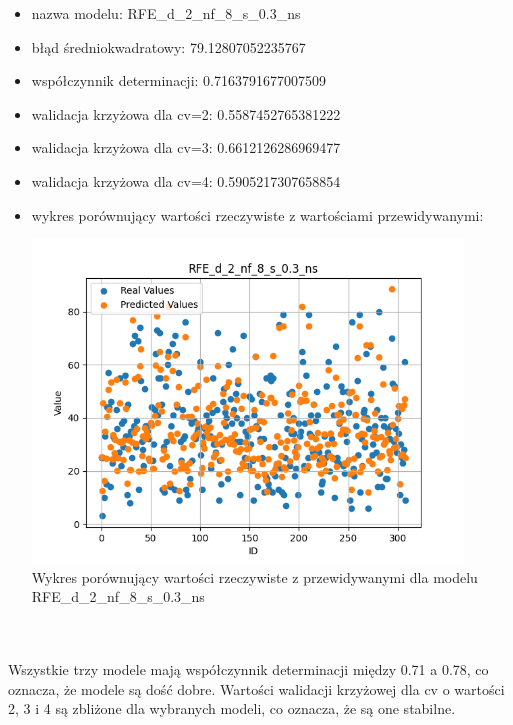 \documentclass[11pt, a4paper, notitlepage]{report}
\begin{document}
\begin{itemize}
	\item nazwa modelu: RFE\_d\_2\_nf\_8\_s\_0.3\_ns
	\item błąd średniokwadratowy: 79.12807052235767
	\item współczynnik determinacji: 0.7163791677007509
	\item walidacja krzyżowa dla cv=2: 0.5587452765381222
	\item walidacja krzyżowa dla cv=3: 0.6612126286969477
	\item walidacja krzyżowa dla cv=4: 0.5905217307658854
	\item wykres porównujący wartości rzeczywiste z wartościami przewidywanymi: \begin{center} \small
		\includegraphics[width=0.9\textwidth]{graphics/plots/RFE_d_2_nf_8_s_0.3_ns.png} \\
		\caption{Wykres porównujący wartości rzeczywiste z przewidywanymi dla modelu RFE\_d\_2\_nf\_8\_s\_0.3\_ns}
	\end{center}
\end{itemize}
\\ \\
Wszystkie trzy modele mają współczynnik determinacji między 0.71 a 0.78, co oznacza, że modele są dość dobre.
Wartości walidacji krzyżowej dla cv o wartości 2, 3 i 4 są zbliżone dla wybranych modeli, co oznacza, że są one stabilne.
\end{document}
